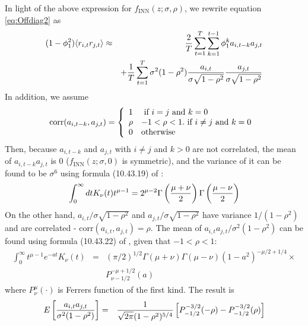 \documentclass{book}
\begin{document}
In light of the above expression for $f_\text{{INN}}(z; \sigma,
\rho)$, we rewrite equation \ref{eq:Offdiag2} as
\begin{eqnarray*}
  (1 - \phi_1^2)\langle r_{i,t} r_{j, t}\rangle &\approx&
  {2 \over T}
  \sum_{t=1}^{T} \sum_{k=1}^{t-1}\phi_1^k a_{i, t-k} a_{j, t} \\
  && + {1 \over T} \sum_{t=1}^{T} \sigma^2 (1 - \rho^2) {a_{i,t} \over
    \sigma \sqrt{1 - \rho^2}} {a_{j,t} \over \sigma \sqrt{1 - \rho^2}} \\
\end{eqnarray*}
In addition, we assume
\begin{equation*}
  \text{corr}(a_{i, t-k}, a_{j, t}) = \left\{
    \begin{array}{l l}
      1 & \text{ if $i=j$ and $k = 0$ }\\
      \rho & -1 < \rho < 1. \text{ if $i \neq j$ and $k = 0$ }\\
      0 & \text{otherwise}
    \end{array}
  \right.
\end{equation*}
Then, because $a_{i, t-k}$ and $ a_{j, t}$ with $i \neq j$ and $k
> 0$ are not correlated, the mean of $a_{i, t-k} a_{j, t}$ is 0
($f_\text{{INN}}(z; \sigma, 0)$ is symmetric), and the variance of it
can be found to be $\sigma^6$ using formula (10.43.19) of \cite{NIST:DLMF}:
\begin{equation*}
  \int_0^\infty dt K_\nu(t) t^{\mu-1} = 2^{\mu-2}
  \Gamma\left(
    {\mu + \nu \over 2}
  \right) \Gamma\left(
    {\mu - \nu \over 2}
  \right)
\end{equation*}
On the other hand, $a_{i,t}/\sigma \sqrt{1 - \rho^2}$ and
$a_{j,t}/\sigma \sqrt{1 - \rho^2}$ have variance $1/(1 - \rho^2)$
and are correlated - $\text{corr}(a_{i,t}, a_{j,t}) = \rho$. The mean
of $a_{i,t}a_{j,t}/\sigma^2 (1 - \rho^2)$ can be found using formula
(10.43.22) of \cite{NIST:DLMF}, given that $-1 < \rho < 1$:
\begin{eqnarray*}
  \int_0^\infty t^{\mu - 1} e^{-at} K_\nu(t) &=& (\pi/2)^{1/2}
  \Gamma(\mu + \nu) \Gamma(\mu - \nu)(1 - a^2)^{-\mu/2 + 1/4} \times\\
  && P^{-\mu+1/2}_{\nu-1/2} (a)
\end{eqnarray*}
where $P^\mu_\nu(\cdot)$ is Ferrers function of the first kind. The
result is
\begin{eqnarray*}
  E\left[{a_{i,t}a_{j,t} \over \sigma^2 (1 - \rho^2)}\right]
  &=&
  {1 \over \sqrt{2\pi} (1 - \rho^2)^{5/4}} \left[
    P^{-3/2}_{-1/2}(-\rho) - P^{-3/2}_{-1/2}(\rho)
  \right]
\end{eqnarray*}
\end{document}
